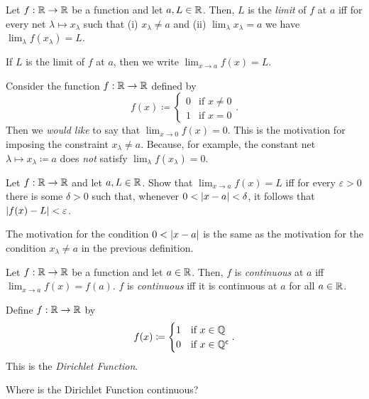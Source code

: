 \begin{dfn}\label{dfn3.4.1}
Let $f:\mathbb{R} \rightarrow \mathbb{R}$ be a function and let $a,L\in \mathbb{R}$.  Then, $L$ is the \emph{limit} of $f$ at $a$ iff for every net $\lambda \mapsto x_\lambda$ such that (i) $x_\lambda \neq a$ and (ii) $\lim _\lambda x_\lambda =a$ we have $\lim _\lambda f(x_\lambda )=L$.
\begin{rmk}
If $L$ is the limit of $f$ at $a$, then we write $\lim _{x\to a}f(x)=L$.
\end{rmk}
\begin{rmk}
Consider the function $f:\mathbb{R} \rightarrow \mathbb{R}$ defined by
\begin{equation}
f(x)\coloneqq \begin{cases}0 & \text{if }x\neq 0 \\ 1 & \text{if }x=0\end{cases}.
\end{equation}
Then we \emph{would like} to say that $\lim _{x\to 0}f(x)=0$.  This is the motivation for imposing the constraint $x_\lambda \neq a$.  Because, for example, the constant net $\lambda \mapsto x_\lambda \coloneqq a$ does \emph{not} satisfy $\lim _\lambda f(x_\lambda )=0$.
\end{rmk}
\end{dfn}
\begin{exr}
Let $f:\mathbb{R} \rightarrow \mathbb{R}$ and let $a,L\in \mathbb{R}$.  Show that $\lim _{x\to a}f(x)=L$ iff for every $\varepsilon >0$ there is some $\delta >0$ such that, whenever $0<\lvert x-a\rvert<\delta$, it follows that $\lvert f(x)-L\rvert<\varepsilon$.
\begin{rmk}
The motivation for the condition $0<\lvert x-a\rvert$ is the same as the motivation for the condition $x_\lambda \neq a$ in the previous definition.
\end{rmk}
\end{exr}
\begin{dfn}
Let $f:\mathbb{R} \rightarrow \mathbb{R}$ be a function and let $a\in \mathbb{R}$.  Then, $f$ is \emph{continuous} at $a$ iff $\lim _{x\to a}f(x)=f(a)$.  $f$ is \emph{continuous} iff it is continuous at $a$ for all $a\in \mathbb{R}$.
\end{dfn}
\begin{exm}\label{DirichletFunction}
Define $f:\mathbb{R} \rightarrow \mathbb{R}$ by
\begin{equation}
f(x)\coloneqq \begin{cases}1 & \text{if }x\in \mathbb{Q} \\ 0 & \text{if }x\in \mathbb{Q} ^{\mathsf{c}}\end{cases}.
\end{equation}
This is the \emph{Dirichlet Function}.
\begin{exr}
Where is the Dirichlet Function continuous?
\end{exr}
\end{exm}
